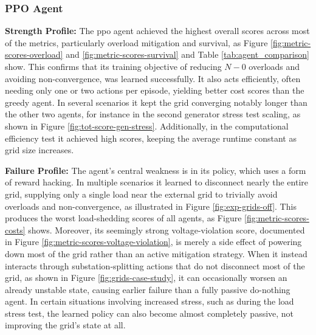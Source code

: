 \subsubsection{PPO Agent}
\textbf{Strength Profile:} The \ac{ppo} agent achieved the highest overall scores across most of the metrics, particularly overload mitigation and survival, as Figure \ref{fig:metric-scores-overload} and \ref{fig:metric-scores-survival} and Table \ref{tab:agent_comparison} show. This confirms that its training objective of reducing $N-0$ overloads and avoiding non-convergence, was learned successfully. It also acts efficiently, often needing only one or two actions per episode, yielding better cost scores than the greedy agent. In several scenarios it kept the grid converging notably longer than the other two agents, for instance in the second generator stress test scaling, as shown in Figure \ref{fig:tot-score-gen-stress}. Additionally, in the computational efficiency test it achieved high scores, keeping the average runtime constant as grid size increases. 

\textbf{Failure Profile:} The agent's central weakness is in its policy, which uses a form of reward hacking. In multiple scenarios it learned to disconnect nearly the entire grid, supplying only a single load near the external grid to trivially avoid overloads and non-convergence, as illustrated in Figure \ref{fig:exp-grids-off}. This produces the worst load-shedding scores of all agents, as Figure \ref{fig:metric-scores-costs} shows. Moreover, its seemingly strong voltage-violation score, documented in Figure \ref{fig:metric-scores-voltage-violation}, is merely a side effect of powering down most of the grid rather than an active mitigation strategy. When it instead interacts through substation-splitting actions that do not disconnect most of the grid, as shown in Figure \ref{fig:grids-case-study}, it can occasionally worsen an already unstable state, causing earlier failure than a fully passive do-nothing agent. In certain situations involving increased stress, such as during the load stress test, the learned policy can also become almost completely passive, not improving the grid's state at all.
